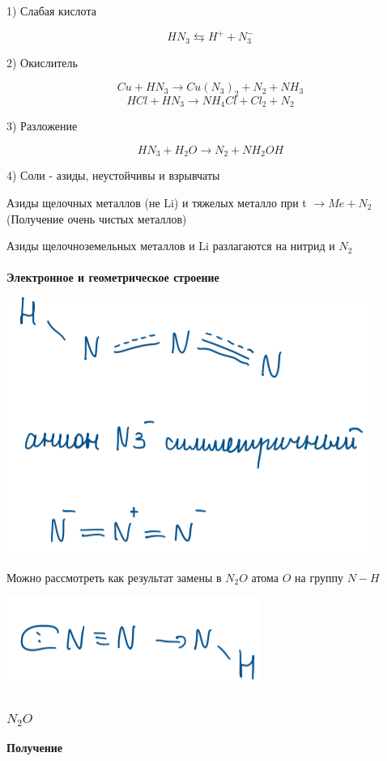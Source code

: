 \documentclass[14pt,a4paper]{scrartcl}
\begin{document}
1) Слабая кислота

$$HN_3 \leftrightarrows H^+ + N_3^-$$

2) Окислитель

$$Cu + HN_3 \rightarrow Cu(N_3)_2 + N_2 + NH_3$$
$$HCl + HN_3 \rightarrow NH_4Cl + Cl_2 + N_2$$

3) Разложение

$$HN_3 + H_2O \rightarrow N_2 + NH_2OH$$

4) Соли - азиды, неустойчивы и взрывчаты

Азиды щелочных металлов (не Li) и тяжелых металло при t $\rightarrow Me + N_2$
(Получение очень чистых металлов)

Азиды щелочноземельных металлов и Li разлагаются на нитрид и $N_2$\\
\\

\textbf{Электронное и геометрическое строение}

\includegraphics{8v5.png}

Можно рассмотреть как результат замены в $N_2O$ атома $O$ на группу $N-H$

\includegraphics{8v6.png}

\subsubsection{$N_2O$}

\textbf{Получение}
\end{document}
